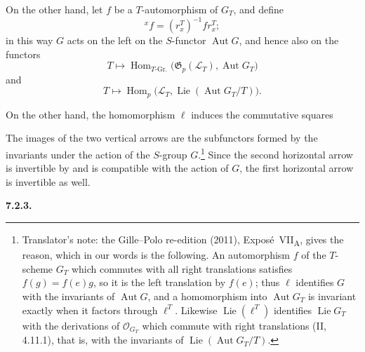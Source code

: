 On the other hand, let \(f\) be a \(T\)-automorphism of \(G_T\),
and define
\[
  {}^x f=(r_x^T)^{-1}fr_x^T;
\]
in this way \(G\) acts on the left on the \(S\)-functor
\(\operatorname{Aut}G\), and hence also on the functors
\[
  T\longmapsto
  \operatorname{Hom}_{T\text{-Gr.}}
    \bigl(\mathfrak G_p(\mathcal L_T),
          \operatorname{Aut}G_T\bigr)
\]
and
\[
  T\longmapsto
  \operatorname{Hom}_p
    \bigl(
      \mathcal L_T,
      \operatorname{Lie}(\operatorname{Aut}G_T/T)
    \bigr).
\]

On the other hand, the homomorphism \(\ell\) induces the commutative
squares
\begin{center}
  \label{sga3:VIIA:7.2.2-lie-invariant-commutative-squares}
  
\end{center}
The images of the two vertical arrows are the subfunctors
formed by the invariants under the action of the \(S\)-group
\(G\).\footnote{Translator's note: the Gille--Polo re-edition (2011),
Expos\'e~VII\textsubscript{A}, gives the reason, which in our words is
the following. An automorphism \(f\) of the \(T\)-scheme \(G_T\) which
commutes with all right translations satisfies \(f(g)=f(e)g\), so it is
the left translation by \(f(e)\); thus \(\ell\) identifies \(G\) with the
invariants of \(\operatorname{Aut}G\), and a homomorphism into
\(\operatorname{Aut}G_T\) is invariant exactly when it factors through
\(\ell^T\). Likewise \(\operatorname{Lie}(\ell^T)\) identifies
\(\operatorname{Lie}G_T\) with the derivations of \(\mathcal O_{G_T}\)
which commute with right translations (II, 4.11.1), that is, with the
invariants of \(\operatorname{Lie}(\operatorname{Aut}G_T/T)\).} Since the second horizontal arrow is invertible by 
and is compatible with the action of \(G\), the first
horizontal arrow is invertible as well.

\medskip
\noindent\textbf{7.2.3.}
\label{sga3:VIIA:7.2.3}

